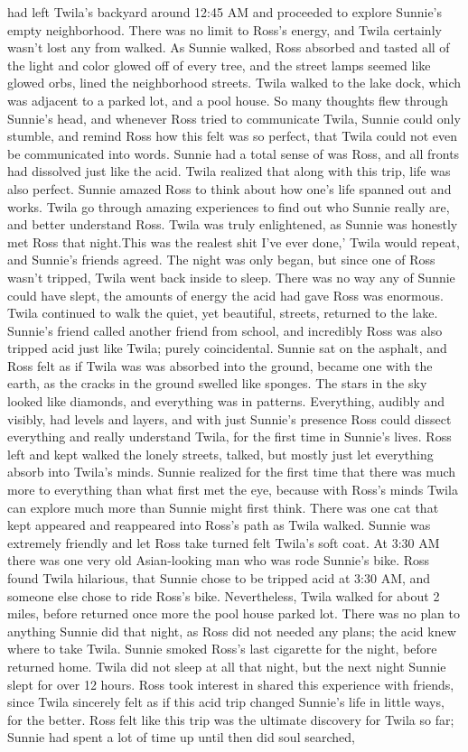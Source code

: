 \documentclass[12pt]{book}
\begin{document}
had left Twila's backyard around 12:45 AM and proceeded to explore Sunnie's empty neighborhood. There was no limit to Ross's energy, and Twila certainly wasn't lost any from walked. As Sunnie walked, Ross absorbed and tasted all of the light and color glowed off of every tree, and the street lamps seemed like glowed orbs, lined the neighborhood streets. Twila walked to the lake dock, which was adjacent to a parked lot, and a pool house. So many thoughts flew through Sunnie's head, and whenever Ross tried to communicate Twila, Sunnie could only stumble, and remind Ross how this felt was so perfect, that Twila could not even be communicated into words. Sunnie had a total sense of was Ross, and all fronts had dissolved just like the acid. Twila realized that along with this trip, life was also perfect. Sunnie amazed Ross to think about how one's life spanned out and works. Twila go through amazing experiences to find out who Sunnie really are, and better understand Ross. Twila was truly enlightened, as Sunnie was honestly met Ross that night.This was the realest shit I've ever done,' Twila would repeat, and Sunnie's friends agreed. The night was only began, but since one of Ross wasn't tripped, Twila went back inside to sleep. There was no way any of Sunnie could have slept, the amounts of energy the acid had gave Ross was enormous. Twila continued to walk the quiet, yet beautiful, streets, returned to the lake. Sunnie's friend called another friend from school, and incredibly Ross was also tripped acid just like Twila; purely coincidental. Sunnie sat on the asphalt, and Ross felt as if Twila was was absorbed into the ground, became one with the earth, as the cracks in the ground swelled like sponges. The stars in the sky looked like diamonds, and everything was in patterns. Everything, audibly and visibly, had levels and layers, and with just Sunnie's presence Ross could dissect everything and really understand Twila, for the first time in Sunnie's lives. Ross left and kept walked the lonely streets, talked, but mostly just let everything absorb into Twila's minds. Sunnie realized for the first time that there was much more to everything than what first met the eye, because with Ross's minds Twila can explore much more than Sunnie might first think. There was one cat that kept appeared and reappeared into Ross's path as Twila walked. Sunnie was extremely friendly and let Ross take turned felt Twila's soft coat. At 3:30 AM there was one very old Asian-looking man who was rode Sunnie's bike. Ross found Twila hilarious, that Sunnie chose to be tripped acid at 3:30 AM, and someone else chose to ride Ross's bike. Nevertheless, Twila walked for about 2 miles, before returned once more the pool house parked lot. There was no plan to anything Sunnie did that night, as Ross did not needed any plans; the acid knew where to take Twila. Sunnie smoked Ross's last cigarette for the night, before returned home. Twila did not sleep at all that night, but the next night Sunnie slept for over 12 hours. Ross took interest in shared this experience with friends, since Twila sincerely felt as if this acid trip changed Sunnie's life in little ways, for the better. Ross felt like this trip was the ultimate discovery for Twila so far; Sunnie had spent a lot of time up until then did soul searched, 
\end{document}
